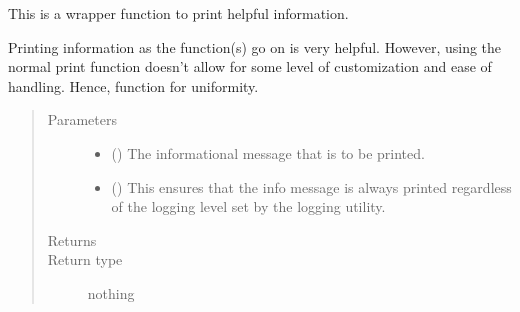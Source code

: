 \documentclass[letterpaper,10pt,english]{sphinxmanual}
\begin{document}
\begin{fulllineitems}
\label{\detokenize{docstrings/ifa_smeargle.core.error:ifa_smeargle.core.error.ifas_info}}
This is a wrapper function to print helpful information.

Printing information as the function(s) go on is very helpful.
However, using the normal print function doesn’t allow for some
level of customization and ease of handling. Hence, function
for uniformity.
\begin{quote}\begin{description}
\item[{Parameters}] \leavevmode\begin{itemize}
\item {} 
 () \textendash{} The informational message that is to be printed.

\item {} 
 (\sphinxstyleliteralemphasis{\sphinxupquote{ (}}\sphinxstyleliteralemphasis{\sphinxupquote{)}}) \textendash{} This ensures that the info message is always printed
regardless of the logging level set by the logging utility.

\end{itemize}

\item[{Returns}] \leavevmode


\item[{Return type}] \leavevmode
nothing

\end{description}\end{quote}

\end{fulllineitems}

\end{document}

